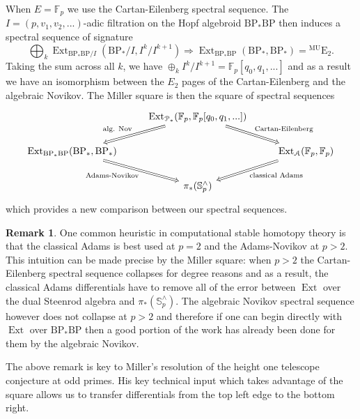 \documentclass[10pt]{amsart}
\theoremstyle{definition}
\numberwithin{figure}{section}
\numberwithin{equation}{section}
\newtheorem{remark}[figure]{Remark}
\newcommand{\cA}{\mathcal{A}}
\newcommand{\cP}{\mathcal{P}}
\newcommand{\MU}{\mathrm{MU}}
\newcommand{\BP}{\mathrm{BP}}
\newcommand{\Ext}{\operatorname{Ext}}
\newcommand{\genanss}[1]{{}^{\mathrm{#1}}\mathrm{E}}
\theoremstyle{cited}
\newcommand{\bS}{\mathbb{S}}
\newcommand{\bF}{\mathbb{F}}
\begin{document}
When $E=\bF_p$ we use the Cartan-Eilenberg spectral sequence. The $I=(p,v_1,v_2,...)$-adic filtration on the Hopf algebroid $\BP_*\BP$ then induces a spectral sequence of signature
\[
  \bigoplus_k \Ext_{\BP_*\BP/I}(\BP_*/I,I^k/I^{k+1})\Rightarrow \Ext_{\BP_*\BP}(\BP_*,\BP_*) = \genanss{\MU}_2.
\]
Taking the sum across all $k$, we have $\oplus_k I^k/I^{k+1}=\bF_p[q_0,q_1,...]$ and as a result we have an isomorphism between the $E_2$ pages of the Cartan-Eilenberg and the algebraic Novikov. The Miller square is then the square of spectral sequences
\[\begin{tikzcd}
	& {\Ext_{\cP_*}(\bF_p, \bF_p[q_0,q_1,...])} \\
	{\Ext_{\BP_*\BP}(\BP_*,\BP_*)} && {\Ext_{\cA}(\bF_p,\bF_p)} \\
	& {\pi_*(\bS^\wedge_p)}
	\arrow["{\text{alg. Nov}}"', Rightarrow, from=1-2, to=2-1]
	\arrow["{\text{Cartan-Eilenberg}}", Rightarrow, from=1-2, to=2-3]
	\arrow["{\text{Adams-Novikov}}"', Rightarrow, from=2-1, to=3-2]
	\arrow["{\text{classical Adams}}", Rightarrow, from=2-3, to=3-2]
\end{tikzcd}\]
which provides a new comparison between our spectral sequences.

\begin{remark}
  One common heuristic in computational stable homotopy theory is that the classical Adams is best used at $p=2$ and the Adams-Novikov at $p>2$. This intuition can be made precise by the Miller square: when $p>2$ the Cartan-Eilenberg spectral sequence collapses for degree reasons and as a result, the classical Adams differentials have to remove all of the error between $\Ext$ over the dual Steenrod algebra and $\pi_*(\bS^\wedge_p)$. The algebraic Novikov spectral sequence however does not collapse at $p>2$ and therefore if one can begin directly with $\Ext$ over $\BP_*\BP$ then a good portion of the work has already been done for them by the algebraic Novikov.
\end{remark}

The above remark is key to Miller's resolution of the height one telescope conjecture at odd primes. His key technical input which takes advantage of the square allows us to transfer differentials from the top left edge to the bottom right.
\end{document}

